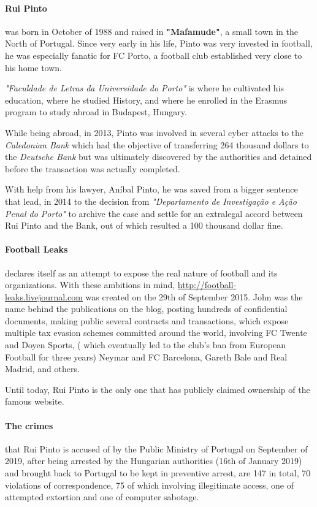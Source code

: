\paragraph{Rui Pinto}
was born in October of 1988 and raised in \textbf{"Mafamude"}, a small town in the North of Portugal.
Since very early in his life, Pinto was very invested in football, he was especially fanatic for FC Porto, a football club established very close to his home town.

\textit{"Faculdade de Letras da Universidade do Porto"} is where he cultivated his education, where he studied History, and where he enrolled in the Erasmus program to study abroad in Budapest, Hungary.

While being abroad, in 2013, Pinto was involved in several cyber attacks to the \textit{Caledonian Bank} which had the objective of transferring 264 thousand dollars to the \textit{Deutsche Bank} but was ultimately discovered by the authorities and detained before the transaction was actually completed.

With help from his lawyer, Aníbal Pinto, he was saved from a bigger sentence that lead, in 2014 to the decision from \textit{"Departamento de Investigação e Ação Penal do Porto"} to archive the case and settle for an extralegal accord between Rui Pinto and the Bank, out of which resulted a 100 thousand dollar fine.

\paragraph{Football Leaks} declares itself as an attempt to expose the real nature of football and its organizations.
With these ambitions in mind, \url{http://football-leaks.livejournal.com} was created on the 29th of September 2015.
John was the name behind the publications on the blog, posting hundreds of confidential documents, making public several contracts and transactions, which expose multiple tax evasion schemes committed around the world, involving FC Twente and Doyen Sports, ( which eventually led to the club's ban from European Football for three years) Neymar and FC Barcelona, Gareth Bale and Real Madrid, and others.

Until today, Rui Pinto is the only one that has publicly claimed ownership of the famous website.

\paragraph{The crimes} that Rui Pinto is accused of by the Public Ministry of Portugal on September of 2019, after being arrested by the Hungarian authorities (16th of January 2019) and brought back to Portugal to be kept in preventive arrest, are 147 in total, 70 violations of correspondence, 75 of which involving illegitimate access, one of attempted extortion and one of computer sabotage.

